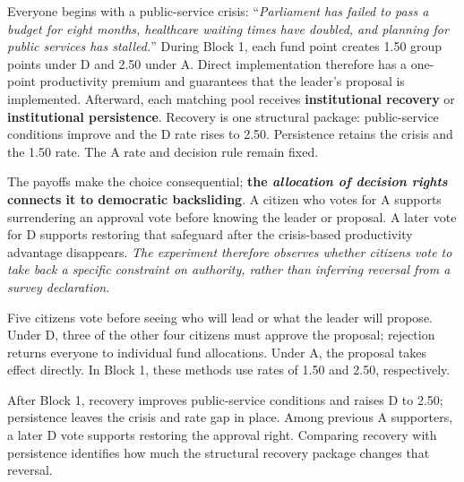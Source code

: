 \documentclass[11pt,a4paper]{article}
\newcommand{\Dproc}{\textsf{D}}
\newcommand{\Aproc}{\textsf{A}}
\begin{document}
Everyone begins with a public-service crisis: \enquote{\emph{Parliament has failed to pass a budget for eight months, healthcare waiting times have doubled, and planning for public services has stalled.}} During Block 1, each fund point creates 1.50 group points under \Dproc{} and 2.50 under \Aproc{}. Direct implementation therefore has a one-point productivity premium and guarantees that the leader's proposal is implemented. Afterward, each matching pool receives {\bf institutional recovery} or {\bf institutional persistence}. Recovery is one structural package: public-service conditions improve and the \Dproc{} rate rises to 2.50. Persistence retains the crisis and the 1.50 rate. The \Aproc{} rate and decision rule remain fixed.

The payoffs make the choice consequential; {\bf the \emph{allocation of decision rights} connects it to democratic backsliding}. A citizen who votes for \Aproc{} supports surrendering an approval vote before knowing the leader or proposal. A later vote for \Dproc{} supports restoring that safeguard after the crisis-based productivity advantage disappears. \emph{The experiment therefore observes whether citizens vote to take back a specific constraint on authority, rather than inferring reversal from a survey declaration}.

\begin{plainlanguagebox}
Five citizens vote before seeing who will lead or what the leader will propose. Under \Dproc{}, three of the other four citizens must approve the proposal; rejection returns everyone to individual fund allocations. Under \Aproc{}, the proposal takes effect directly. In Block 1, these methods use rates of 1.50 and 2.50, respectively.

After Block 1, recovery improves public-service conditions and raises \Dproc{} to 2.50; persistence leaves the crisis and rate gap in place. Among previous \Aproc{} supporters, a later \Dproc{} vote supports restoring the approval right. Comparing recovery with persistence identifies how much the structural recovery package changes that reversal.
\end{plainlanguagebox}
\end{document}
